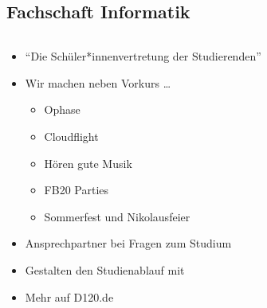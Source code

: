\subsection*{Fachschaft Informatik}
\begin{frame}
    \slidehead
    \begin{columns}[b]
        \begin{column}{ .6\textwidth }
            \begin{itemize}[<+->]
                \item \enquote{Die Schüler*innenvertretung der Studierenden}
                \item Wir machen neben Vorkurs \dots
                    \begin{itemize}
                        \item Ophase
                        \item Cloudflight
                        \item Hören gute Musik
                        \item FB20 Parties
                        \item Sommerfest und Nikolausfeier
                    \end{itemize}
                \item Ansprechpartner bei Fragen zum Studium
                \item Gestalten den Studienablauf mit
                    \vspace{.4cm}
                \item {\centering \huge Mehr auf D120.de}
            \end{itemize}
        \end{column}%
        \begin{column}{ .4\textwidth }
\end{column}
\end{columns}
\end{frame}
